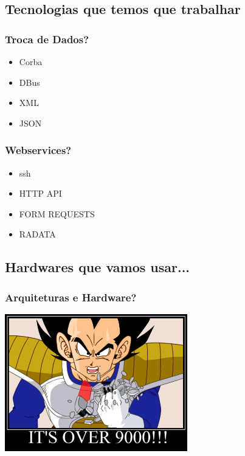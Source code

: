 \documentclass{beamer}
\begin{document}
\subsection{Tecnologias que temos que trabalhar}
\begin{frame} \frametitle{Troca de Dados?}
    \begin{itemize}
     \item Corba
     \item DBus
     \item XML
     \item JSON
    \end{itemize}
\end{frame}

\begin{frame} \frametitle{Webservices?}
 \begin{itemize}
  \item ssh
  \item HTTP API
  \item FORM REQUESTS
  \item RADATA
 \end{itemize}
\end{frame}

\subsection{Hardwares que vamos usar...}

\begin{frame} \frametitle{Arquiteturas e Hardware?}
    \includegraphics[width=300px]{images/over--9000}
\end{frame}
\end{document}
